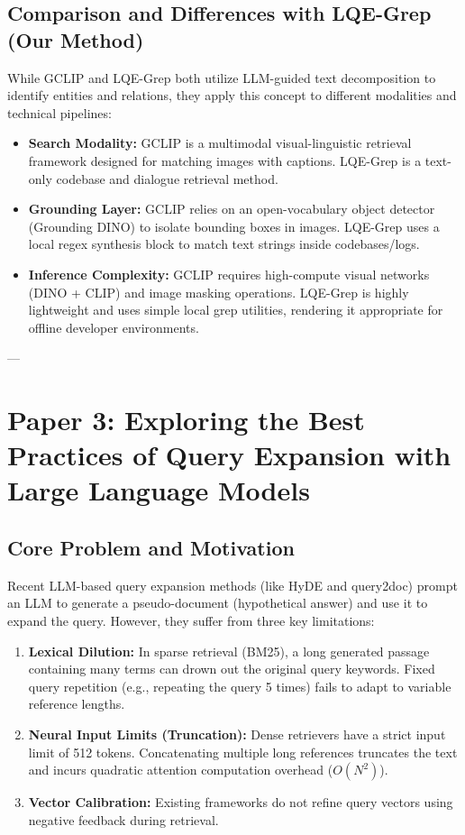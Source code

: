 \documentclass[11pt,a4paper]{article}
\begin{document}
\subsection{Comparison and Differences with LQE-Grep (Our Method)}
While GCLIP and LQE-Grep both utilize LLM-guided text decomposition to identify entities and relations, they apply this concept to different modalities and technical pipelines:
\begin{itemize}
    \item \textbf{Search Modality:} GCLIP is a multimodal visual-linguistic retrieval framework designed for matching images with captions. LQE-Grep is a text-only codebase and dialogue retrieval method.
    \item \textbf{Grounding Layer:} GCLIP relies on an open-vocabulary object detector (Grounding DINO) to isolate bounding boxes in images. LQE-Grep uses a local regex synthesis block to match text strings inside codebases/logs.
    \item \textbf{Inference Complexity:} GCLIP requires high-compute visual networks (DINO + CLIP) and image masking operations. LQE-Grep is highly lightweight and uses simple local grep utilities, rendering it appropriate for offline developer environments.
\end{itemize}

---

\section{Paper 3: Exploring the Best Practices of Query Expansion with Large Language Models}
\label{sec:paper3}

\subsection{Core Problem and Motivation}
Recent LLM-based query expansion methods (like HyDE and query2doc) prompt an LLM to generate a pseudo-document (hypothetical answer) and use it to expand the query. However, they suffer from three key limitations:
\begin{enumerate}
    \item \textbf{Lexical Dilution:} In sparse retrieval (BM25), a long generated passage containing many terms can drown out the original query keywords. Fixed query repetition (e.g., repeating the query 5 times) fails to adapt to variable reference lengths.
    \item \textbf{Neural Input Limits (Truncation):} Dense retrievers have a strict input limit of 512 tokens. Concatenating multiple long references truncates the text and incurs quadratic attention computation overhead ($O(N^2)$).
    \item \textbf{Vector Calibration:} Existing frameworks do not refine query vectors using negative feedback during retrieval.
\end{enumerate}
\end{document}

